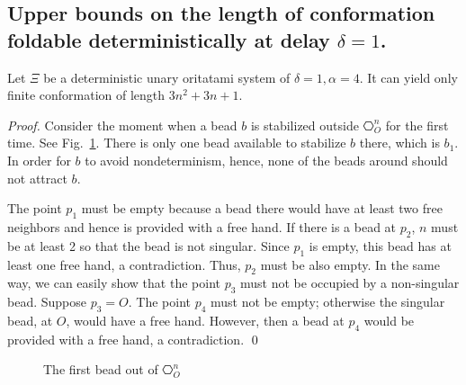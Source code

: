

\subsection{Upper bounds on the length of conformation foldable deterministically at delay $\delta = 1$.}


\begin{theorem}[$\delta = 1, \alpha = 4$]
Let $\Xi$ be a deterministic unary oritatami system of $\delta = 1, \alpha = 4$. It can yield only finite conformation of length $3n^2  + 3n + 1$.
\end{theorem}

\begin{proof}
Consider the moment when a bead $b$ is stabilized outside $\hexagon_O^n$ for the first time. 
See Fig.~\ref{TTT_a4_first}.
There is only one bead available to stabilize $b$ there, which is $b_1$. 
In order for $b$ to avoid nondeterminism, hence, none of the beads around should not attract $b$. 

The point $p_1$ must be empty because a bead there would have at least two free neighbors and hence is provided with a free hand. 
If there is a bead at $p_2$, $n$ must be at least 2 so that the bead is not singular. 
Since $p_1$ is empty, this bead has at least one free hand, a contradiction. 
Thus, $p_2$ must be also empty. 
In the same way, we can easily show that the point $p_3$ must not be occupied by a non-singular bead. 
Suppose $p_3 = O$. 
The point $p_4$ must not be empty; otherwise the singular bead, at $O$, would have a free hand. 
However, then a bead at $p_4$ would be provided with a free hand, a contradiction. 
\qed
\end{proof}

\begin{figure}[tb]
 \centering
    \caption{The first bead out of $\hexagon_{O}^n$}
    \label{TTT_a4_first}
\end{figure}



